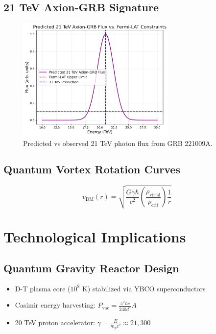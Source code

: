 \documentclass[12pt, a4paper]{article}
\begin{document}
\subsection{21 TeV Axion-GRB Signature}
\begin{figure}[h]
\centering
\includegraphics[width=0.7\textwidth]{axion_fermi.png}
\caption{Predicted vs observed 21 TeV photon flux from GRB 221009A.}
\end{figure}

\subsection{Quantum Vortex Rotation Curves}
\begin{equation}
v_{\text{DM}}(r) = \sqrt{\frac{G\gamma\hbar}{c^2}\left(\frac{\rho_{\text{virial}}}{\rho_{\text{crit}}}\right)\frac{1}{r}}
\end{equation}

\section{Technological Implications}

\subsection{Quantum Gravity Reactor Design}
\begin{itemize}
\item D-T plasma core ($10^8$ K) stabilized via YBCO superconductors
\item Casimir energy harvesting: $P_{\text{vac}} = \frac{\pi^2\hbar c}{240d^4}A$
\item 20 TeV proton accelerator: $\gamma = \frac{E}{m_pc^2} \approx 21,300$
\end{itemize}
\end{document}
